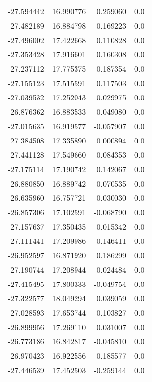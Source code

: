 \begin{tabular}{rrrr}
      -27.594442 &        16.990776 &    0.259060 &   0.0 \\
      -27.482189 &        16.884798 &    0.169223 &   0.0 \\
      -27.496002 &        17.422668 &    0.110828 &   0.0 \\
      -27.353428 &        17.916601 &    0.160308 &   0.0 \\
      -27.237112 &        17.775375 &    0.187354 &   0.0 \\
      -27.155123 &        17.515591 &    0.117503 &   0.0 \\
      -27.039532 &        17.252043 &    0.029975 &   0.0 \\
      -26.876362 &        16.883533 &   -0.049080 &   0.0 \\
      -27.015635 &        16.919577 &   -0.057907 &   0.0 \\
      -27.384508 &        17.335890 &   -0.000894 &   0.0 \\
      -27.441128 &        17.549660 &    0.084353 &   0.0 \\
      -27.175114 &        17.190742 &    0.142067 &   0.0 \\
      -26.880850 &        16.889742 &    0.070535 &   0.0 \\
      -26.635960 &        16.757721 &   -0.030030 &   0.0 \\
      -26.857306 &        17.102591 &   -0.068790 &   0.0 \\
      -27.157637 &        17.350435 &    0.015342 &   0.0 \\
      -27.111441 &        17.209986 &    0.146411 &   0.0 \\
      -26.952597 &        16.871920 &    0.186299 &   0.0 \\
      -27.190744 &        17.208944 &    0.024484 &   0.0 \\
      -27.415495 &        17.800333 &   -0.049754 &   0.0 \\
      -27.322577 &        18.049294 &    0.039059 &   0.0 \\
      -27.028593 &        17.653744 &    0.103827 &   0.0 \\
      -26.899956 &        17.269110 &    0.031007 &   0.0 \\
      -26.773186 &        16.842817 &   -0.045810 &   0.0 \\
      -26.970423 &        16.922556 &   -0.185577 &   0.0 \\
      -27.446539 &        17.452503 &   -0.259144 &   0.0 \\

\end{tabular}
